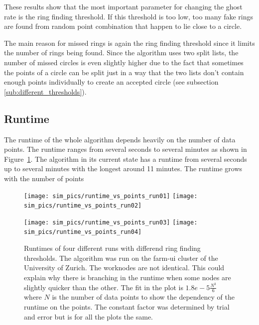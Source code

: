 \documentclass[11pt,twoside]{scrreprt}
\begin{document}
These results show that the most important parameter for changing the ghost rate is the ring finding threshold.
If this threshold is too low, too many fake rings are found from random point combination that happen to lie close to a circle.

The main reason for missed rings is again the ring finding threshold since it limits the number of rings
being found. Since the algorithm uses two split lists, the number of missed circles is even slightly higher due to the
fact that sometimes the points of a circle can be split just in a way that the two lists don't
contain enough points individually to create an accepted circle (see subsection \ref{sub:different_thresholds}).
\subsection{Runtime} %
\label{sub:runtime}

The runtime of the whole algorithm depends heavily on the number of data points. The runtime ranges from several seconds to 
several minutes as shown in Figure~\ref{fig:runtime}. The algorithm in its current state has a runtime from several seconds up
to several minutes with the longest around 11 minutes. The runtime grows with the number of points

\begin{figure}[tb]
  \centering
  \texttt{[image: sim\_pics/runtime\_vs\_points\_run01]}%
  \texttt{[image: sim\_pics/runtime\_vs\_points\_run02]}

  \texttt{[image: sim\_pics/runtime\_vs\_points\_run03]}%
  \texttt{[image: sim\_pics/runtime\_vs\_points\_run04]}
  \caption[Runtimes of four different runs]{Runtimes of four different runs with differend ring finding thresholds. The algorithm was run on the farm-ui cluster of the
  University of Zurich. The worknodes are not identical. This could explain why there is branching in the runtime when some 
  nodes are slightly quicker than the other. The fit in the plot is $1.8e{-}5\frac{N^3}{6}$ where $N$ is the number of data points
  to show the dependency of the runtime on the points. The constant factor was determined by trial and error but is for all the plots
  the same.}
  \label{fig:runtime}
\end{figure}

\end{document}

